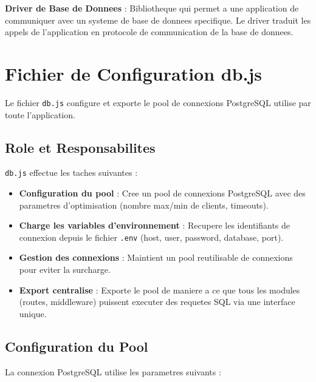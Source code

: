 \documentclass[a4paper,12pt]{book}
\begin{document}
\begin{definitionbox}
    \textbf{Driver de Base de Donnees} : Bibliotheque qui permet a une application de communiquer avec un systeme de base de donnees specifique. Le driver traduit les appels de l'application en protocole de communication de la base de donnees.
\end{definitionbox}

\section{Fichier de Configuration db.js}

Le fichier \texttt{db.js} configure et exporte le pool de connexions PostgreSQL utilise par toute l'application.

\subsection{Role et Responsabilites}

\texttt{db.js} effectue les taches suivantes :

\begin{itemize}
    \item \textbf{Configuration du pool} : Cree un pool de connexions PostgreSQL avec des parametres d'optimisation (nombre max/min de clients, timeouts).
    \item \textbf{Charge les variables d'environnement} : Recupere les identifiants de connexion depuis le fichier \texttt{.env} (host, user, password, database, port).
    \item \textbf{Gestion des connexions} : Maintient un pool reutilisable de connexions pour eviter la surcharge.
    \item \textbf{Export centralise} : Exporte le pool de maniere a ce que tous les modules (routes, middleware) puissent executer des requetes SQL via une interface unique.
\end{itemize}

\subsection{Configuration du Pool}

La connexion PostgreSQL utilise les parametres suivants :
\end{document}
